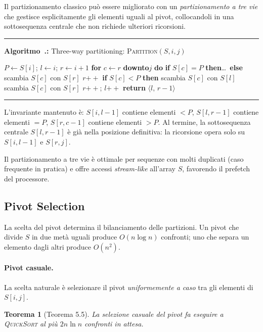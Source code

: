 \documentclass[12pt, a4paper, oneside]{book}
\newcounter{algocf}[chapter]
\renewcommand{\thealgocf}{\thechapter.\arabic{algocf}}
\newenvironment{algorithm}[1][H]{%
  \refstepcounter{algocf}%
  \par\medskip\noindent\rule{\linewidth}{0.4pt}\par\smallskip
}{%
  \par\smallskip\noindent\rule{\linewidth}{0.4pt}\par\medskip
}
\newcommand{\algcaption}[1]{\noindent\textbf{Algoritmo~\thealgocf:} #1\par\smallskip}
\newcommand{\For}[1]{\noindent\textbf{for} #1 \textbf{do}}
\newcommand{\If}[1]{\noindent\textbf{if} #1 \textbf{then}}
\newcommand{\Return}[1]{\noindent\textbf{return} #1}
\newcommand{\KwA}{\textbf{downto}}
\newcommand{\eSe}[1]{\noindent\textbf{if} #1 \textbf{then}\ldots\ \textbf{else}}
\theoremstyle{plain}
\newtheorem{teorema}{Teorema}[chapter]
\theoremstyle{definition}
\theoremstyle{remark}
\begin{document}
Il partizionamento classico può essere migliorato con un \emph{partizionamento a tre vie} che gestisce esplicitamente gli elementi uguali al pivot, collocandoli in una sottosequenza centrale che non richiede ulteriori ricorsioni.

\begin{algorithm}[H]
\algcaption{Three-way partitioning: \textsc{Partition}$(S, i, j)$}
$P \leftarrow S[i]$; \quad $l \leftarrow i$; \quad $r \leftarrow i+1$\;
\For{$c \leftarrow r$ \KwA $j$}{
  \eSe{$S[c] = P$}{
    scambia $S[c]$ con $S[r]$\;
    $r\mathrel{+\!\!+}$\;
  }{
    \If{$S[c] < P$}{
      scambia $S[c]$ con $S[l]$\;
      scambia $S[c]$ con $S[r]$\;
      $r\mathrel{+\!\!+}$; $l\mathrel{+\!\!+}$\;
    }
  }
}
\Return{$\langle l,\, r-1\rangle$}\;
\end{algorithm}

L'invariante mantenuto è: $S[i, l-1]$ contiene elementi $< P$, $S[l, r-1]$ contiene elementi $= P$, $S[r, c-1]$ contiene elementi $> P$. Al termine, la sottosequenza centrale $S[l, r-1]$ è già nella posizione definitiva: la ricorsione opera solo su $S[i, l-1]$ e $S[r, j]$.

Il partizionamento a tre vie è ottimale per sequenze con molti duplicati (caso frequente in pratica) e offre accessi \emph{stream-like} all'array $S$, favorendo il prefetch del processore.

\subsection{Pivot Selection}

La scelta del pivot determina il bilanciamento delle partizioni. Un pivot che divide $S$ in due metà uguali produce $O(n\log n)$ confronti; uno che separa un elemento dagli altri produce $O(n^2)$.

\paragraph{Pivot casuale.}
La scelta naturale è selezionare il pivot \emph{uniformemente a caso} tra gli elementi di $S[i,j]$.

\begin{teorema}[Teorema 5.5]
La selezione casuale del pivot fa eseguire a \textsc{QuickSort} al più $2n\ln n$ confronti in attesa.
\end{teorema}
\end{document}
